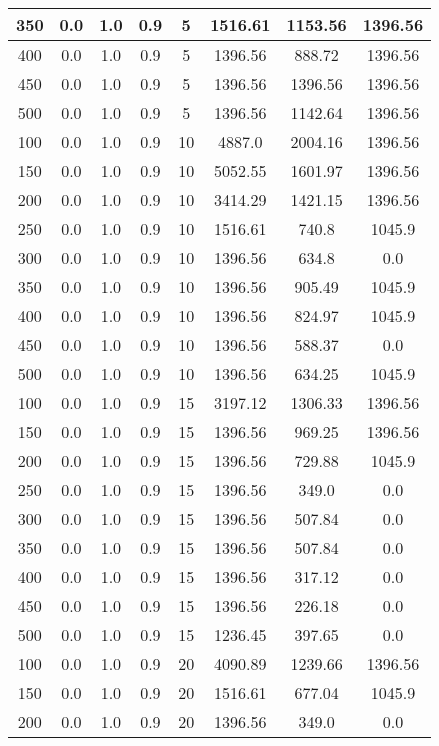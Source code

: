 \documentclass[a4paper, 12pt]{extreport}
\begin{document}
\begin{itemize}
\begin{longtable}{|c|c|c|c|c|c|c|c|}
			350 & 0.0 & 1.0 & 0.9 & 5 & 1516.61 & 1153.56 & 1396.56 \\\hline
			400 & 0.0 & 1.0 & 0.9 & 5 & 1396.56 & 888.72 & 1396.56 \\\hline
			450 & 0.0 & 1.0 & 0.9 & 5 & 1396.56 & 1396.56 & 1396.56 \\\hline
			500 & 0.0 & 1.0 & 0.9 & 5 & 1396.56 & 1142.64 & 1396.56 \\\hline
			100 & 0.0 & 1.0 & 0.9 & 10 & 4887.0 & 2004.16 & 1396.56 \\\hline
			150 & 0.0 & 1.0 & 0.9 & 10 & 5052.55 & 1601.97 & 1396.56 \\\hline
			200 & 0.0 & 1.0 & 0.9 & 10 & 3414.29 & 1421.15 & 1396.56 \\\hline
			250 & 0.0 & 1.0 & 0.9 & 10 & 1516.61 & 740.8 & 1045.9 \\\hline
			300 & 0.0 & 1.0 & 0.9 & 10 & 1396.56 & 634.8 & 0.0 \\\hline
			350 & 0.0 & 1.0 & 0.9 & 10 & 1396.56 & 905.49 & 1045.9 \\\hline
			400 & 0.0 & 1.0 & 0.9 & 10 & 1396.56 & 824.97 & 1045.9 \\\hline
			450 & 0.0 & 1.0 & 0.9 & 10 & 1396.56 & 588.37 & 0.0 \\\hline
			500 & 0.0 & 1.0 & 0.9 & 10 & 1396.56 & 634.25 & 1045.9 \\\hline
			100 & 0.0 & 1.0 & 0.9 & 15 & 3197.12 & 1306.33 & 1396.56 \\\hline
			150 & 0.0 & 1.0 & 0.9 & 15 & 1396.56 & 969.25 & 1396.56 \\\hline
			200 & 0.0 & 1.0 & 0.9 & 15 & 1396.56 & 729.88 & 1045.9 \\\hline
			250 & 0.0 & 1.0 & 0.9 & 15 & 1396.56 & 349.0 & 0.0 \\\hline
			300 & 0.0 & 1.0 & 0.9 & 15 & 1396.56 & 507.84 & 0.0 \\\hline
			350 & 0.0 & 1.0 & 0.9 & 15 & 1396.56 & 507.84 & 0.0 \\\hline
			400 & 0.0 & 1.0 & 0.9 & 15 & 1396.56 & 317.12 & 0.0 \\\hline
			450 & 0.0 & 1.0 & 0.9 & 15 & 1396.56 & 226.18 & 0.0 \\\hline
			500 & 0.0 & 1.0 & 0.9 & 15 & 1236.45 & 397.65 & 0.0 \\\hline
			100 & 0.0 & 1.0 & 0.9 & 20 & 4090.89 & 1239.66 & 1396.56 \\\hline
			150 & 0.0 & 1.0 & 0.9 & 20 & 1516.61 & 677.04 & 1045.9 \\\hline
			200 & 0.0 & 1.0 & 0.9 & 20 & 1396.56 & 349.0 & 0.0 \\\hline

\end{longtable}
\end{itemize}
\end{document}
